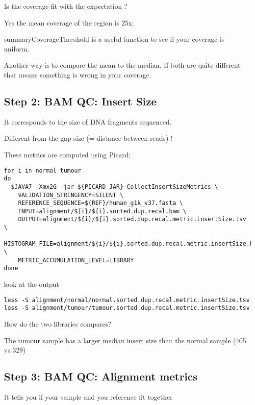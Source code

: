 \begin{questions}
Is the coverage fit with the expectation ?
\end{questions}
\begin{answer}
Yes the mean coverage of the region is 25x:

summaryCoverageThreshold is a useful function to see if your coverage is uniform.
 
Another way is to compare the mean to the median. If both are quite different that means something is wrong in your coverage.
\end{answer}

\subsection{Step 2: BAM QC: Insert Size}
It corresponds to the size of DNA fragments sequenced.

Different from the gap size (= distance between reads) !

These metrics are computed using Picard:

\begin{lstlisting}
for i in normal tumour
do
  $JAVA7 -Xmx2G -jar ${PICARD_JAR} CollectInsertSizeMetrics \
    VALIDATION_STRINGENCY=SILENT \
    REFERENCE_SEQUENCE=${REF}/human_g1k_v37.fasta \
    INPUT=alignment/${i}/${i}.sorted.dup.recal.bam \
    OUTPUT=alignment/${i}/${i}.sorted.dup.recal.metric.insertSize.tsv \
    HISTOGRAM_FILE=alignment/${i}/${i}.sorted.dup.recal.metric.insertSize.histo.pdf \
    METRIC_ACCUMULATION_LEVEL=LIBRARY
done
\end{lstlisting}

look at the output

\begin{lstlisting}
less -S alignment/normal/normal.sorted.dup.recal.metric.insertSize.tsv
less -S alignment/tumour/tumour.sorted.dup.recal.metric.insertSize.tsv
\end{lstlisting}

\begin{questions}
How do the two libraries compares? 
\end{questions}
\begin{answer}
The tumour sample has a larger median insert size than the normal sample (405 vs 329) 
\end{answer}

\subsection{Step 3: BAM QC: Alignment metrics}
It tells you if your sample and you reference fit together

